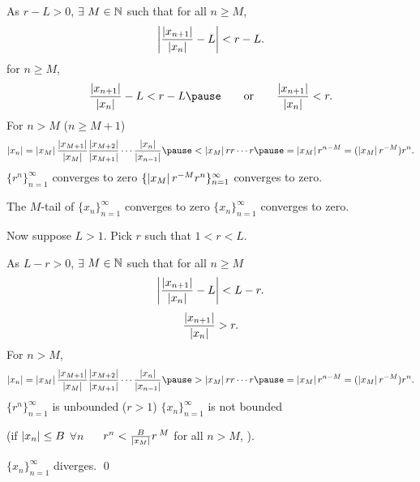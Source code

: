 \documentclass[10pt,aspectratio=169]{beamer}
\begin{document}
\begin{frame}
As $r-L > 0$, $\exists$ $M \in {\mathbb{N}}$ such that for
all $n \geq M$,
\begin{equation*}
\left\lvert {\frac{\left\lvert {x_{n+1}} \right\rvert}{\left\lvert {x_n} \right\rvert} - L} \right\rvert < r-L .
\end{equation*}
\pause
\thus \quad for $n \geq M$,
\begin{equation*}
\frac{\abs{x_{n+1}}}{\abs{x_n}} - L < r-L 
\pause
\qquad \text{or} \qquad
\frac{\abs{x_{n+1}}}{\abs{x_n}} < r .
\end{equation*}
\pause
For $n > M$ ($n \geq M+1$)
\begin{equation*}
\abs{x_n} =
\abs{x_M}
\frac{\abs{x_{M+1}}}{\abs{x_{M}}}
\frac{\abs{x_{M+2}}}{\abs{x_{M+1}}}
\cdots
\frac{\abs{x_{n}}}{\abs{x_{n-1}}}
\pause
<
\abs{x_M}
r r \cdots r
\pause
= \abs{x_M} r^{n-M} = (\abs{x_M} r^{-M}) r^n .
\end{equation*}
\pause
$\{ r^n \}_{n=1}^\infty$ converges to zero
\pause
\wthus
$\{ \left\lvert {x_M} \right\rvert r^{-M} r^n \}_{n=1}^\infty$ converges to zero.
  
\pause
\medskip

The $M$-tail of $\{x_n\}_{n=1}^\infty$ converges to zero \wthus
$\{x_n\}_{n=1}^\infty$ converges to zero.

\end{frame}

\begin{frame}
Now suppose $L > 1$.
\pause
\quad
Pick $r$ such that $1 < r < L$.
 
\pause
\medskip

As $L-r > 0$,
$\exists$ $M \in {\mathbb{N}}$ such that for
all $n \geq M$
\begin{equation*}
\left\lvert {\frac{\left\lvert {x_{n+1}} \right\rvert}{\left\lvert {x_n} \right\rvert} - L} \right\rvert < L-r .
\end{equation*}
\pause
\thus
\begin{equation*}
\frac{\left\lvert {x_{n+1}} \right\rvert}{\left\lvert {x_n} \right\rvert} > r .
\end{equation*}
\pause
For $n > M$,
\begin{equation*}
\abs{x_n} =
\abs{x_M}
\frac{\abs{x_{M+1}}}{\abs{x_{M}}}
\frac{\abs{x_{M+2}}}{\abs{x_{M+1}}}
\cdots
\frac{\abs{x_{n}}}{\abs{x_{n-1}}}
\pause
>
\abs{x_M}
r r \cdots r
\pause
= \abs{x_M} r^{n-M} = (\abs{x_M} r^{-M}) r^n .
\end{equation*}
\pause
$\{ r^n \}_{n=1}^\infty$ is unbounded ($r > 1$)
\pause
\wthus
$\{x_n\}_{n=1}^\infty$ is not bounded

\pause
(if $\left\lvert {x_n} \right\rvert \leq B$ $\forall n$ ~\thus~
$r^n < \frac{B}{\left\lvert {x_M} \right\rvert} r^{\:M}$ for all $n > M$, \contradiction).

\pause
\medskip
\thus \quad $\{ x_n \}_{n=1}^\infty$ diverges.
\qed

\end{frame}
\end{document}
